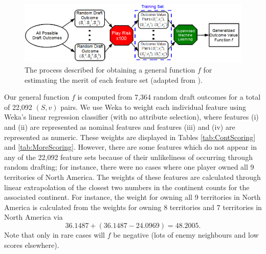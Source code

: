 \documentclass[letterpaper]{article}
\numberwithin{equation}{section}
\numberwithin{theorem}{section}
\numberwithin{lemma}{section}
\numberwithin{df}{section}
\begin{document}
\begin{figure}[t]
	\centering
	\includegraphics[scale=0.5]{figs/MachineLearner.png}
	\caption{The process described for obtaining a general function $f$ for estimating the merit of each feature set (adapted from \cite[Figure 5.1]{GregLeeThesis}).}
	\label{fig:MachLearn}
\end{figure}

Our general function $f$ is computed from 7,364 random draft outcomes for a total of 22,092 $(S,v)$ pairs.  We use Weka \cite{Weka} to weight each individual feature using Weka's linear regression classifier (with no attribute selection), where features (i) and (ii) are represented as nominal features and features (iii) and (iv) are represented as numeric.  These weights are displayed in Tables \ref{tab:ContScoring} and \ref{tab:MoreScoring}.  However, there are some features which do not appear in any of the 22,092 feature sets because of their unlikeliness of occurring through random drafting; for instance, there were no cases where one player owned all 9 territories of North America.  The weights of these features are calculated through linear extrapolation of the closest two numbers in the continent counts for the associated continent.  For instance, the weight for owning all 9 territories in North America is calculated from the weights for owning 8 territories and 7 territories in North America via
\[ 36.1487 + (36.1487 - 24.0969) = 48.2005. \]  
Note that only in rare cases will $f$ be negative (lots of enemy neighbours and low scores elsewhere).  %
\end{document}
